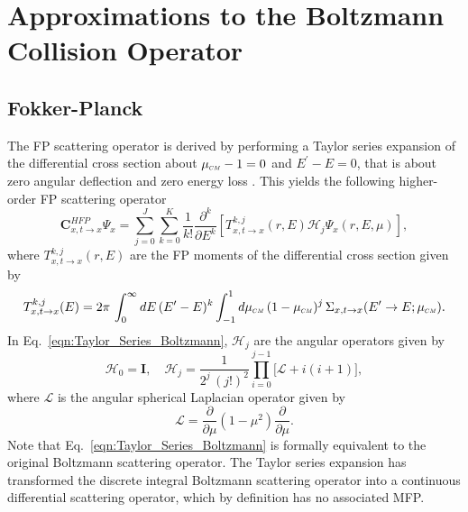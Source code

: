 \documentclass[../main.tex]{subfiles}
\begin{document}
\chapter{Approximations to the Boltzmann Collision Operator}

\section{Fokker-Planck}
The FP scattering operator is derived by performing a Taylor series expansion of the differential cross section about $\mucm - 1= 0$ and $E^{\prime}-E = 0$, that is about zero angular deflection and zero energy loss \cite{Pomraning-1996}. This yields the following higher-order FP scattering operator
\begin{equation} \label{eqn:Taylor_Series_Boltzmann}
    \boldsymbol{C}_{x,t \rightarrow x}^{HFP} \Psi_x = \sum_{j=0}^{J} \sum_{k=0}^{K} \dfrac{1}{k!} \dfrac{\partial^k}{\partial E^k} \left[ T_{x,t\rightarrow x}^{k,j}(r,E) \boldsymbol{\mathcal{H}}_{j} \Psi_x(r,E,\mu) \right],
\end{equation}
where $T_{x,t\rightarrow x}^{k,j}(r,E)$ are the FP moments of the differential cross section given by
\begin{equation} \label{eqn:FP_data_moments}
    T_{x,t\rightarrow x}^{k,j} (E) = 2\pi \, \int_{0}^{\infty} dE \, (E^{\prime} - E)^k \int_{-1}^{1} d \mucm \, (1 - \mucm)^j \, \Sigma_{x,t\rightarrow x}(E^{\prime}\rightarrow E;\mucm).
\end{equation}
In Eq.~\eqref{eqn:Taylor_Series_Boltzmann}, $\boldsymbol{\mathcal{H}}_{j}$ are the angular operators given by
\begin{equation} \label{eqn:angular_operators}
    \boldsymbol{\mathcal{H}}_0 = \boldsymbol{I}, \quad \boldsymbol{\mathcal{H}}_j = \dfrac{1}{2^j \, (j!)^2} \prod_{i=0}^{j-1} \Big[ \boldsymbol{\mathcal{L}} + i(i+1) \Big],
\end{equation}
where $\boldsymbol{\mathcal{L}}$ is the angular spherical Laplacian operator given by
\begin{equation}
    \boldsymbol{\mathcal{L}} = \dfrac{\partial}{\partial \mu} (1 - \mu^2) \dfrac{\partial}{\partial \mu}.
\end{equation}
Note that Eq.~\eqref{eqn:Taylor_Series_Boltzmann} is formally equivalent to the original Boltzmann scattering operator. The Taylor series expansion has transformed the discrete integral Boltzmann scattering operator into a continuous differential scattering operator, which by definition has no associated MFP.
\end{document}
